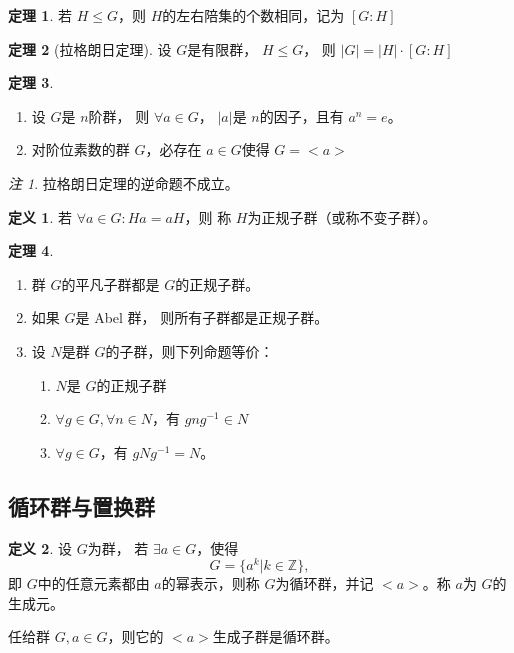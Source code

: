 \documentclass[a4paper,11pt]{article}%
\theoremstyle{remark}
\newtheorem*{remark}{注}
\theoremstyle{remark}
\theoremstyle{definition}
\newtheorem{theorem}{定理}[section]
\theoremstyle{definition}
\newtheorem*{definition}{定义}
\theoremstyle{plain}
\newcommand*{\abs}[1]{\lvert #1 \rvert}
\begin{document}
\begin{theorem}
    若 $H\leq G$，则 $H$的左右陪集的个数相同，记为 $[G:H]$
\end{theorem}
\begin{theorem}[拉格朗日定理]
   设 $G$是有限群， $H\leq G$， 则 $\abs{G}=\abs{H}\cdot[G:H]$ 
\end{theorem}
\begin{theorem}
    \begin{enumerate}
   \item  设 $G$是 $n$阶群， 则 $\forall a\in G$， $\abs{a}$是 $n$的因子，且有 $a^n=e$。
   \item 对阶位素数的群 $G$，必存在 $a\in G$使得 $G=<a>$
    \end{enumerate}
\end{theorem}
\begin{remark}
    拉格朗日定理的逆命题不成立。
\end{remark}
\begin{definition}
    若 $\forall a\in G:Ha=aH$，则 称 $H$为正规子群（或称不变子群）。
\end{definition}
\begin{theorem}
    \begin{enumerate}
        \item 群 $G$的平凡子群都是 $G$的正规子群。
        \item 如果 $G$是 Abel 群， 则所有子群都是正规子群。
        \item 设 $N$是群 $G$的子群，则下列命题等价：
        \begin{enumerate}
            \item  $N$是 $G$的正规子群 
            \item  $\forall g\in G,\forall n\in N$，有 $gng^{-1}\in N$
            \item  $\forall g\in G$，有 $gNg^{-1}=N$。
        \end{enumerate}
    \end{enumerate}
\end{theorem}
\subsection{循环群与置换群}
\begin{definition}
    设 $G$为群， 若 $\exists a\in G$，使得 
    \[G=\{a^k|k\in \mathbb{Z}\},\]
    即 $G$中的任意元素都由 $a$的幂表示，则称 $G$为循环群，并记 $<a>$。称 $a$为 $G$的生成元。
\end{definition}
任给群 $G,a\in G$，则它的 $<a>$生成子群是循环群。
\end{document}
